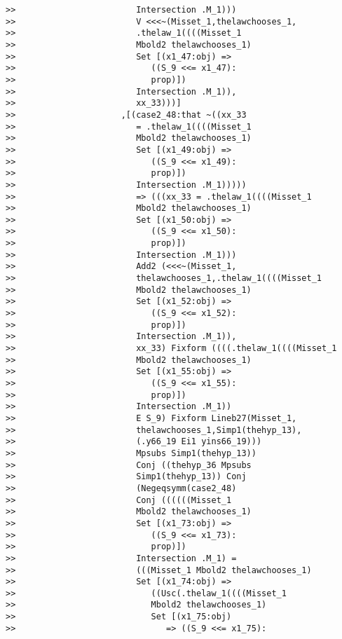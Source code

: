 \documentclass[12pt]{article}
\begin{document}
\begin{verbatim}
>>                        Intersection .M_1)))
>>                        V <<<~(Misset_1,thelawchooses_1,
>>                        .thelaw_1((((Misset_1
>>                        Mbold2 thelawchooses_1)
>>                        Set [(x1_47:obj) =>
>>                           ((S_9 <<= x1_47):
>>                           prop)])
>>                        Intersection .M_1)),
>>                        xx_33)))]
>>                     ,[(case2_48:that ~((xx_33
>>                        = .thelaw_1((((Misset_1
>>                        Mbold2 thelawchooses_1)
>>                        Set [(x1_49:obj) =>
>>                           ((S_9 <<= x1_49):
>>                           prop)])
>>                        Intersection .M_1)))))
>>                        => (((xx_33 = .thelaw_1((((Misset_1
>>                        Mbold2 thelawchooses_1)
>>                        Set [(x1_50:obj) =>
>>                           ((S_9 <<= x1_50):
>>                           prop)])
>>                        Intersection .M_1)))
>>                        Add2 (<<<~(Misset_1,
>>                        thelawchooses_1,.thelaw_1((((Misset_1
>>                        Mbold2 thelawchooses_1)
>>                        Set [(x1_52:obj) =>
>>                           ((S_9 <<= x1_52):
>>                           prop)])
>>                        Intersection .M_1)),
>>                        xx_33) Fixform ((((.thelaw_1((((Misset_1
>>                        Mbold2 thelawchooses_1)
>>                        Set [(x1_55:obj) =>
>>                           ((S_9 <<= x1_55):
>>                           prop)])
>>                        Intersection .M_1))
>>                        E S_9) Fixform Lineb27(Misset_1,
>>                        thelawchooses_1,Simp1(thehyp_13),
>>                        (.y66_19 Ei1 yins66_19)))
>>                        Mpsubs Simp1(thehyp_13))
>>                        Conj ((thehyp_36 Mpsubs
>>                        Simp1(thehyp_13)) Conj
>>                        (Negeqsymm(case2_48)
>>                        Conj ((((((Misset_1
>>                        Mbold2 thelawchooses_1)
>>                        Set [(x1_73:obj) =>
>>                           ((S_9 <<= x1_73):
>>                           prop)])
>>                        Intersection .M_1) =
>>                        (((Misset_1 Mbold2 thelawchooses_1)
>>                        Set [(x1_74:obj) =>
>>                           ((Usc(.thelaw_1((((Misset_1
>>                           Mbold2 thelawchooses_1)
>>                           Set [(x1_75:obj)
>>                              => ((S_9 <<= x1_75):

\end{verbatim}
\end{document}
